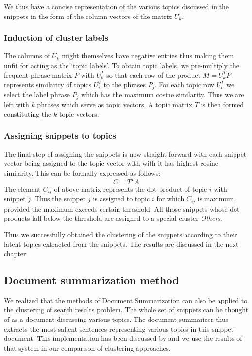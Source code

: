 \documentclass[a4paper,12pt]{report}
\begin{document}
We thus have a concise representation of the various topics discussed
in the snippets in the form of the column vectors of the matrix $U_k$.

\subsubsection{Induction of cluster labels}
The columns of $U_k$ might themselves have negative entries thus
making them unfit for acting as the `topic labels'. To obtain topic
labels, we pre-multiply the frequent phrase matrix $P$ with $U_k^T$ so
that each row of the product $M = U_k^T P$ represents similarity of
topics $U_i^T$ to the phrases $P_j$. For each topic row $U_i^T$ we
select the label phrase $P_j$ which has the maximum cosine
similarity. Thus we are left with $k$ phrases which serve as topic
vectors. A topic matrix $T$ is then formed constituting the $k$ topic
vectors. 

\subsubsection{Assigning snippets to topics}
The final step of assigning the snippets is now straight forward with
each snippet vector being assigned to the topic vector with with it
has highest cosine similarity. This can be formally expressed as
follows:
$$
C = T^T A
$$
The element $C_{ij}$ of above matrix represents the dot product of
topic $i$ with snippet $j$. Thus the snippet $j$ is assigned to topic
$i$ for which $C_{ij}$ is maximum, provided the maximum exceeds
certain threshold. All those snippets whose dot products fall below
the threshold are assigned to a special cluster {\it Others}.

Thus we successfully obtained the clustering of the snippets according
to their latent topics extracted from the snippets. The results are
discussed in the next chapter.

\subsection{Document summarization method}

We realized that the methods of Document Summarization can also be
applied to the clustering of search results problem. The whole set of
snippets can be thought of as a document discussing various
topics. The document summarizer thus extracts the most salient
sentences representing various topics in this snippet-document. This
implementation has been discussed by \cite{satya} and we use the
results of that system in our comparison of clustering approaches.
\end{document}

